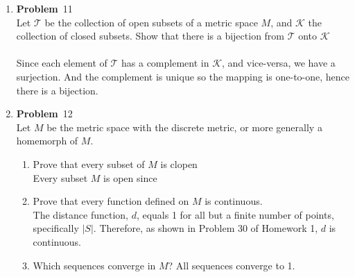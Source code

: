 \documentclass[12pt]{amsart}
\newcommand{\benu}{\begin{enumerate}}
\newcommand{\eenu}{\end{enumerate}}
\theoremstyle{definition}
\newcommand{\mc}[1]{\mathcal{#1}}
\newcommand{\itep}{\item {\bfseries Problem}\ }
\begin{document}
\begin{enumerate}[series=p]
\itep 11\\
Let $\mc{T}$ be the collection of open subsets of a metric space $M$, and $\mc{K}$ the collection of closed subsets.  Show that there is a bijection from $\mc{T}$ onto $\mc{K}$
\\\\
Since each element of $\mc{T}$ has a complement in $\mc{K}$, and vice-versa, we have a surjection.  And the complement is unique so the mapping is one-to-one, hence there is a bijection. 
\newpage

\itep 12\\
Let $M$ be the metric space with the discrete metric, or more generally a homemorph of $M$.
\benu
\item Prove that every subset of $M$ is clopen\\
Every subset $M$ is open since 
\item Prove that every function defined on $M$ is continuous.\\
The distance function, $d$, equals 1 for all but a finite number of points, specifically $|S|$.  Therefore, as shown in Problem 30 of Homework 1, $d$ is continuous.
\item Which sequences converge in $M$?
All sequences converge to 1.
\eenu

\newpage


\end{enumerate}
\end{document}
